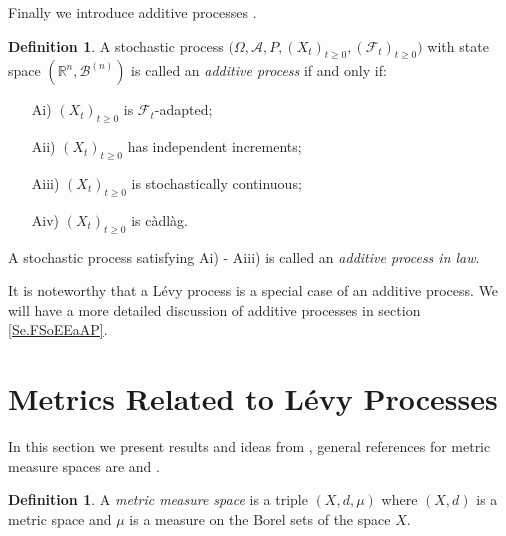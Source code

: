 \documentclass[a4paper, 12pt]{report}
\theoremstyle{cor}
\theoremstyle{remark}
\theoremstyle{definition}
\newtheorem{defn}[theorem]{Definition}
\begin{document}
Finally we introduce additive processes \cite{Sato}.
\begin{defn}
A stochastic process $\big(\Omega, \mathcal{A}, P, (X_t)_{t \ge 0}, (\mathcal{F}_t)_{t \ge 0}\big)$ with state space $(\mathbb{R}^n, \mathcal{B}^{(n)})$ is called an \emph{additive process} if and only if:
\begin{itemize}
\item[Ai)] $(X_t)_{t \ge 0}$ is $\mathcal{F}_t$-adapted;

\item[Aii)] $(X_t)_{t \ge 0}$ has independent increments;

\item[Aiii)] $(X_t)_{t \ge 0}$ is stochastically continuous;

\item[Aiv)] $(X_t)_{t \ge 0}$ is c\`adl\`ag.
\end{itemize}
A stochastic process satisfying Ai) - Aiii) is called an \emph{additive process in law}.
\end{defn}
It is noteworthy that a L\'evy process is a special case of an additive process.  We will have a more detailed discussion of additive processes in section \ref{Se.FSoEEaAP}.


\section{Metrics Related to L\'evy Processes}\label{MRtLP}

In this section we present results and ideas from \cite{Paper}, general references for metric measure spaces are \cite{22in8} and \cite{45in8}.
\begin{defn}
A \emph{metric measure space} is a triple $(X, d, \mu)$ where $(X, d)$ is a metric space and $\mu$ is a measure on the Borel sets of the space $X$.
\end{defn}
\end{document}
